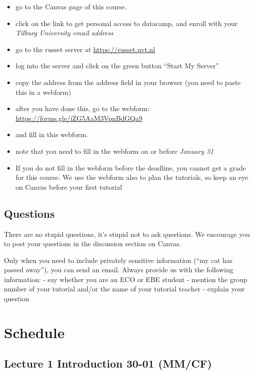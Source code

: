 \documentclass[]{book}
\providecommand{\tightlist}{%
  \setlength{\itemsep}{0pt}\setlength{\parskip}{0pt}}
\begin{document}
\begin{itemize}
\tightlist
\item
  go to the Canvas page of this course.
\item
  click on the link to get personal access to datacamp, and enroll with
  your \emph{Tilburg University email address}
\item
  go to the russet server at \url{https://russet.uvt.nl}
\item
  log into the server and click on the green button ``Start My Server''
\item
  copy the address from the address field in your browser (you need to
  paste this in a webform)
\item
  after you have done this, go to the webform:
  \url{https://forms.gle/iZG5AaM3VpnBdGQa9}
\item
  and fill in this webform.
\item
  note that you need to fill in the webform on or before \emph{January
  31}
\item
  If you do not fill in the webform before the deadline, you cannot get
  a grade for this course. We use the webform also to plan the
  tutorials, so keep an eye on Canvas before your first tutorial
\end{itemize}

\section{Questions}\label{questions}

There are no stupid questions, it's stupid not to ask questions. We
encourage you to post your questions in the discussion section on
Canvas.

Only when you need to include privately sensitive information (``my cat
has passed away''), you can send an email. Always provide us with the
following information: - say whether you are an ECO or EBE student -
mention the group number of your tutorial and/or the name of your
tutorial teacher - explain your question

\chapter{Schedule}\label{schedule}

\section{Lecture 1 Introduction 30-01
(MM/CF)}\label{lecture-1-introduction-30-01-mmcf}
\end{document}
